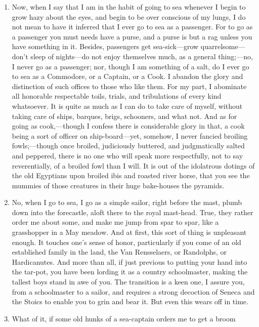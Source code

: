 \documentclass{../armymemo}
\begin{document}
\begin{enumerate}
\begin{enumerate}
  \item Now, when I say that I am in the habit of going to sea whenever I begin
    to grow hazy about the eyes, and begin to be over conscious of my lungs, I
    do not mean to have it inferred that I ever go to sea as a passenger. For to
    go as a passenger you must needs have a purse, and a purse is but a rag
    unless you have something in it. Besides, passengers get sea-sick—grow
    quarrelsome—don’t sleep of nights—do not enjoy themselves much, as a general
    thing;—no, I never go as a passenger; nor, though I am something of a salt,
    do I ever go to sea as a Commodore, or a Captain, or a Cook. I abandon the
    glory and distinction of such offices to those who like them. For my part, I
    abominate all honorable respectable toils, trials, and tribulations of every
    kind whatsoever. It is quite as much as I can do to take care of myself,
    without taking care of ships, barques, brigs, schooners, and what not.  And
    as for going as cook,—though I confess there is considerable glory in that,
    a cook being a sort of officer on ship-board—yet, somehow, I never fancied
    broiling fowls;—though once broiled, judiciously buttered, and judgmatically
    salted and peppered, there is no one who will speak more respectfully, not
    to say reverentially, of a broiled fowl than I will. It is out of the
    idolatrous dotings of the old Egyptians upon broiled ibis and roasted river
    horse, that you see the mummies of those creatures in their huge bake-houses
    the pyramids.
  \item No, when I go to sea, I go as a simple sailor, right before the mast,
    plumb down into the forecastle, aloft there to the royal mast-head.  True,
    they rather order me about some, and make me jump from spar to spar, like a
    grasshopper in a May meadow. And at first, this sort of thing is unpleasant
    enough. It touches one’s sense of honor, particularly if you come of an old
    established family in the land, the Van Rensselaers, or Randolphs, or
    Hardicanutes. And more than all, if just previous to putting your hand into
    the tar-pot, you have been lording it as a country schoolmaster, making the
    tallest boys stand in awe of you. The transition is a keen one, I assure
    you, from a schoolmaster to a sailor, and requires a strong decoction of
    Seneca and the Stoics to enable you to grin and bear it. But even this wears
    off in time.
  \item What of it, if some old hunks of a sea-captain orders me to get a broom

\end{enumerate}
\end{enumerate}
\end{document}

